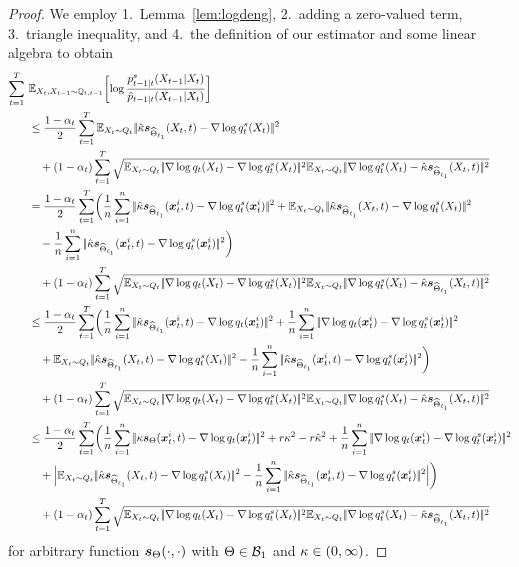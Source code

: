 \begin{proof}
We employ 1.~Lemma~\ref{lem:logdeng}, 2.~adding a zero-valued term, 3.~triangle inequality, and 4.~the definition of our estimator and some linear algebra to obtain 
\allowdisplaybreaks
\begin{align*}
    \sum_{t=1}^{T}~&\E_{X_t,X_{t-1}\sim \Fd_{t,t-1}}\biggl[\log\frac{\Bdd^s_{t-1|t}(X_{t-1}|X_t)}{\BddA_{t-1|t}(X_{t-1}|X_t)}\biggr]\\
    &\le \frac{1-\alpha_t}{2}  \sum_{t=1}^{T} \E_{X_t\sim Q_t}\norm{\scaleh\scorefh(X_t,t)-\nabla\log q^s_t(X_t)}^2\\
    &~~~+(1-\alpha_t)\sum_{t=1}^T\sqrt{\E_{X_t\sim Q_t}\norm{\nabla\log \Fdd_t(X_t)-\nabla\log \Fdds_t(X_t)}^2\E_{X_t\sim Q_t}\norm{\nabla\log \Fdds_t(X_t)-\scaleh\scorefh(X_t,t)}^2}\\
     &= \frac{1-\alpha_t}{2}  \sum_{t=1}^{T} \biggl(\frac{1}{n} \sum_{i=1}^{n}  \norm{\scaleh\scorefh(\x_t^i,t)-\nabla\log q^s_t(\x_t^i)}^2+\E_{X_t\sim Q_t}\norm{\scaleh\scorefh(X_t,t)-\nabla\log q^s_t(X_t)}^2\\
     &~~~-\frac{1}{n} \sum_{i=1}^{n}  \norm{\scaleh\scorefh(\x_t^i,t)-\nabla\log q^s_t(\x_t^i)}^2\biggr)\\
     &~~~+(1-\alpha_t)\sum_{t=1}^T\sqrt{\E_{X_t\sim Q_t}\norm{\nabla\log \Fdd_t(X_t)-\nabla\log \Fdds_t(X_t)}^2\E_{X_t\sim Q_t}\norm{\nabla\log \Fdds_t(X_t)-\scaleh\scorefh(X_t,t)}^2}\\
     &\le \frac{1-\alpha_t}{2}  \sum_{t=1}^{T} \biggl(\frac{1}{n} \sum_{i=1}^{n}  \norm{\scaleh\scorefh(\x_t^i,t)-\nabla\log q_t(\x_t^i)}^2+\frac{1}{n} \sum_{i=1}^{n}  \norm{\nabla \log q_t(\x_t^i)-\nabla\log q^s_t(\x_t^i)}^2\\
     &~~~+\E_{X_t\sim Q_t}\norm{\scaleh\scorefh(X_t,t)-\nabla\log q^s_t(X_t)}^2
     -\frac{1}{n} \sum_{i=1}^{n}  \norm{\scaleh\scorefh(\x_t^i,t)-\nabla\log q^s_t(\x_t^i)}^2\biggr)\\
     &~~~+(1-\alpha_t) \sum_{t=1}^T \sqrt{\E_{X_t\sim Q_t}\norm{\nabla\log \Fdd_t(X_t)-\nabla\log \Fdds_t(X_t)}^2\E_{X_t\sim Q_t}\norm{\nabla\log \Fdds_t(X_t)-\scaleh\scorefh(X_t,t)}^2}\\
      &\le \frac{1-\alpha_t}{2} \sum_{t=1}^{T} \biggl(\frac{1}{n} \sum_{i=1}^{n}  \norm{\scale\scoref(\x_t^i,t)-\nabla\log q_t(\x_t^i)}^2+\tuning\scale^2-\tuning\scaleh^2+\frac{1}{n} \sum_{i=1}^{n}  \norm{\nabla \log q_t(\x_t^i)-\nabla\log q^s_t(\x_t^i)}^2\\
     &~~~+\Bigl|\E_{X_t\sim Q_t}\norm{\scaleh\scorefh(X_t,t)-\nabla\log q^s_t(X_t)}^2
     -\frac{1}{n} \sum_{i=1}^{n}  \norm{\scaleh\scorefh(\x_t^i,t)-\nabla\log q^s_t(\x_t^i)}^2\Bigr|\biggr)\\
     &~~~+(1-\alpha_t) \sum_{t=1}^T \sqrt{\E_{X_t\sim Q_t}\norm{\nabla\log \Fdd_t(X_t)-\nabla\log \Fdds_t(X_t)}^2\E_{X_t\sim Q_t}\norm{\nabla\log \Fdds_t(X_t)-\scaleh\scorefh(X_t,t)}^2}
\end{align*}
for arbitrary function $\textcolor{black}{\textcolor{black}{\boldsymbol{s}}_{\textcolor{black}{\Theta}}}(\cdot,\cdot)$ with $\Theta\in \textcolor{black}{\mathcal{B}_1}$ and $\kappa\in (0,\infty)$.



\end{proof}
